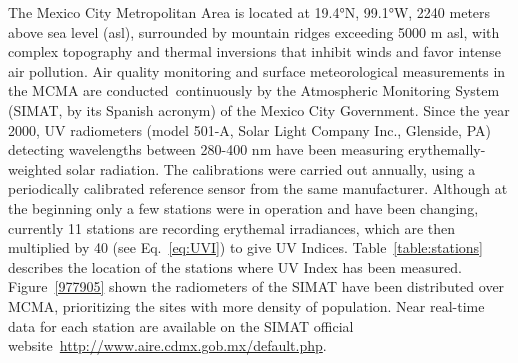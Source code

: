 \documentclass[10pt]{article}
\begin{document}
The Mexico City Metropolitan Area is located at 19.4°N, 99.1°W, 2240
meters above sea level (asl), surrounded by mountain ridges exceeding
5000 m asl, with complex topography and thermal inversions that inhibit
winds and favor intense air pollution.\cite{Whiteman_2000,Fast_2007} Air quality
monitoring and surface meteorological measurements in the MCMA are
conducted~continuously by the Atmospheric Monitoring System (SIMAT, by
its Spanish acronym) of the Mexico City Government. Since the year 2000,
UV radiometers (model 501-A, Solar Light Company Inc., Glenside, PA)
detecting wavelengths between 280-400 nm have been measuring
erythemally-weighted solar radiation. The calibrations were carried out
annually, using a periodically calibrated reference sensor from the same
manufacturer. Although at the beginning only a few stations were in
operation and have been changing, currently 11 stations are recording
erythemal irradiances, which are then multiplied by 40 (see
Eq.~{\ref{eq:UVI}}) to give UV Indices.
Table~{\ref{table:stations}} describes the location of
the stations where UV Index has been measured.
Figure~{\ref{977905}} shown the radiometers of the
SIMAT have been distributed over MCMA, prioritizing the sites with more
density of population. Near real-time data for each station are
available on the SIMAT official
website~\url{http://www.aire.cdmx.gob.mx/default.php}.
\end{document}
